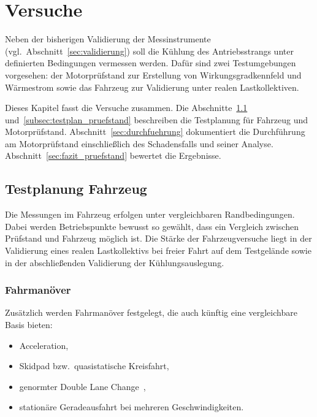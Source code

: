  
\chapter{Versuche}
\label{chap:versuche}
 

Neben der bisherigen Validierung der Messinstrumente (vgl.~Abschnitt~\ref{sec:validierung})
soll die Kühlung des Antriebsstrangs unter definierten Bedingungen vermessen
werden. Dafür sind zwei Testumgebungen vorgesehen: der Motorprüfstand zur
Erstellung von Wirkungsgradkennfeld und Wärmestrom sowie das Fahrzeug zur
Validierung unter realen Lastkollektiven.


Dieses Kapitel fasst die Versuche zusammen. Die Abschnitte~\ref{subsec:testplan_fahrzeug}
und~\ref{subsec:testplan_pruefstand} beschreiben die Testplanung für Fahrzeug und
Motorprüfstand. Abschnitt~\ref{sec:durchfuehrung} dokumentiert die Durchführung am
Motorprüfstand einschließlich des Schadensfalls und seiner Analyse.
Abschnitt~\ref{sec:fazit_pruefstand} bewertet die Ergebnisse.

 
\section{Testplanung Fahrzeug}
\label{subsec:testplan_fahrzeug}
 

Die Messungen im Fahrzeug erfolgen unter vergleichbaren Randbedingungen. Dabei
werden Betriebspunkte bewusst so gewählt, dass ein Vergleich zwischen
Prüfstand und Fahrzeug möglich ist. Die Stärke der Fahrzeugversuche liegt in
der Validierung eines realen Lastkollektivs bei freier Fahrt auf dem Testgelände
sowie in der abschließenden Validierung der Kühlungsauslegung.

\subsection{Fahrmanöver}

Zusätzlich werden Fahrmanöver festgelegt, die auch künftig eine vergleichbare
Basis bieten:

\begin{itemize}
    \item Acceleration,
    \item Skidpad bzw.\ quasistatische Kreisfahrt,
    \item genormter Double Lane Change~\cite{TODO_Norm_Double_Lane_Change},
    \item stationäre Geradeausfahrt bei mehreren Geschwindigkeiten.
\end{itemize}

